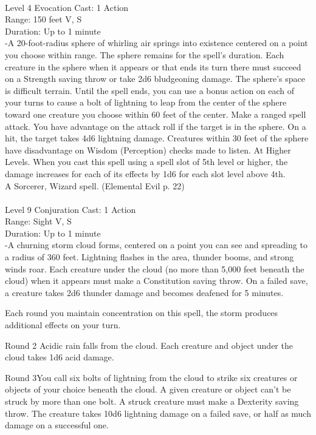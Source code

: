 \documentclass[10pt,twocolumn]{report}
\begin{document}
 \\
Level 4 \quad Evocation \quad Cast: 1 Action\\
Range: 150 feet \quad V, S\\
Duration: Up to 1 minute \quad \\
-A 20-foot-radius sphere of whirling air springs into existence centered on a point you choose within range. The sphere remains for the spell’s duration. Each creature in the sphere when it appears or that ends its turn there must succeed on a Strength saving throw or take 2d6 bludgeoning damage. The sphere’s space is difficult terrain.
Until the spell ends, you can use a bonus action on each of your turns to cause a bolt of lightning to leap from the center of the sphere toward one creature you choose within 60 feet of the center. Make a ranged spell attack. You have advantage on the attack roll if the target is in the sphere. On a hit, the target takes 4d6 lightning damage.
Creatures within 30 feet of the sphere have disadvantage on Wisdom (Perception) checks made to listen.
At Higher Levels. When you cast this spell using a spell slot of 5th level or higher, the damage increases for each of its effects by 1d6 for each slot level above 4th.\\
A Sorcerer, Wizard spell. (Elemental Evil p. 22) \\


 \\
Level 9 \quad Conjuration \quad Cast: 1 Action\\
Range: Sight \quad V, S\\
Duration: Up to 1 minute \quad \\
-A churning storm cloud forms, centered on a point you can see and spreading to a radius of 360 feet. Lightning flashes in the area, thunder booms, and strong winds roar. Each creature under the cloud (no more than 5,000 feet beneath the cloud) when it appears must make a Constitution saving throw. On a failed save, a creature takes 2d6 thunder damage and becomes deafened for 5 minutes.

Each round you maintain concentration on this spell, the storm produces additional effects on your turn.

Round 2
Acidic rain falls from the cloud. Each creature and object under the cloud takes 1d6 acid damage.

Round 3You call six bolts of lightning from the cloud to strike six creatures or objects of your choice beneath the cloud. A given creature or object can’t be struck by more than one bolt. A struck creature must make a Dexterity saving throw. The creature takes 10d6 lightning damage on a failed save, or half as much damage on a successful one.
\end{document}
